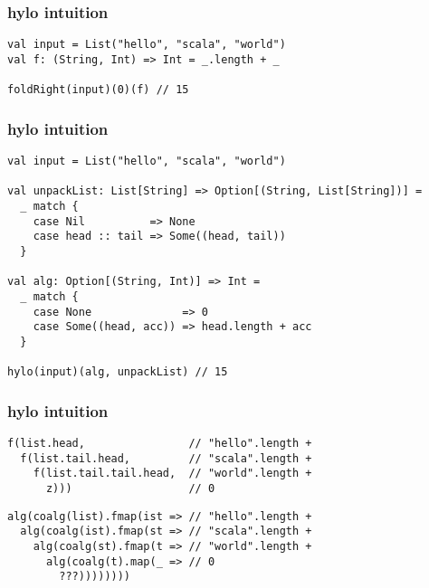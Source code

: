 \documentclass[include/preamble.tex]{subfiles}
\begin{document}
\begin{frame}[fragile]
\begin{center}
  \end{center}
\end{frame}

\begin{frame}[fragile]
  \frametitle{hylo intuition}
  \begin{center}
    \begin{lstlisting}[style=scala]
val input = List("hello", "scala", "world")
val f: (String, Int) => Int = _.length + _

foldRight(input)(0)(f) // 15
    \end{lstlisting}
  \end{center}
\end{frame}

\begin{frame}[fragile]
  \frametitle{hylo intuition}
  \begin{center}
    \begin{lstlisting}[style=scala]
val input = List("hello", "scala", "world")

val unpackList: List[String] => Option[(String, List[String])] =
  _ match {
    case Nil          => None
    case head :: tail => Some((head, tail))
  }

val alg: Option[(String, Int)] => Int =
  _ match {
    case None              => 0
    case Some((head, acc)) => head.length + acc
  }

hylo(input)(alg, unpackList) // 15
    \end{lstlisting}
  \end{center}
\end{frame}

\begin{frame}[fragile]
  \frametitle{hylo intuition}
  \begin{center}
    \begin{lstlisting}[style=scala]
f(list.head,                // "hello".length +
  f(list.tail.head,         // "scala".length +
    f(list.tail.tail.head,  // "world".length +
      z)))                  // 0
    \end{lstlisting}
    \begin{lstlisting}[style=scala]
alg(coalg(list).fmap(ist => // "hello".length +
  alg(coalg(ist).fmap(st => // "scala".length +
    alg(coalg(st).fmap(t => // "world".length +
      alg(coalg(t).map(_ => // 0
        ???))))))))
    \end{lstlisting}
  \end{center}
\end{frame}
\end{document}
